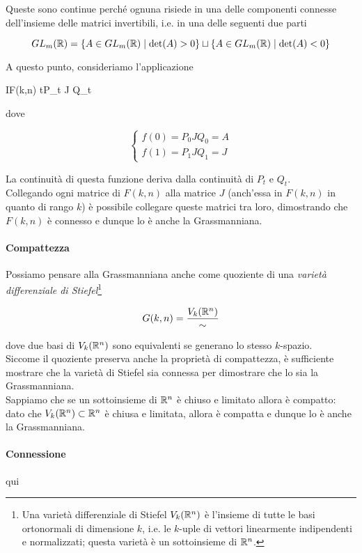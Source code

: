{Queste sono continue perché ognuna risiede in una delle componenti connesse dell'insieme delle matrici invertibili, i.e. in una delle seguenti due parti

\begin{equation}
	GL_{m}(\mathbb{R}) = \{ A \in GL_{m}(\mathbb{R}) \mid \det(A) > 0 \} \sqcup \{ A \in GL_{m}(\mathbb{R}) \mid \det(A) < 0 \}
\end{equation}

A questo punto, consideriamo l'applicazione

	{I}{F(k,n)}
	{t}{P_{t} J Q_{t}}

dove

\begin{equation}
	\begin{cases}
		f(0) = P_{0} J Q_{0} = A \\
		f(1) = P_{1} J Q_{1} = J
	\end{cases}
\end{equation}

La continuità di questa funzione deriva dalla continuità di $ P_{t} $ e $ Q_{t} $. \\
Collegando ogni matrice di $ F(k,n) $ alla matrice $ J $ (anch'essa in $ F(k,n) $ in quanto di rango $ k $) è possibile collegare queste matrici tra loro, dimostrando che $ F(k,n) $ è connesso e dunque lo è anche la Grassmanniana.

\paragraph{Compattezza}

Possiamo pensare alla Grassmanniana anche come quoziente di una \textit{varietà differenziale di Stiefel}\footnote{%
	Una varietà differenziale di Stiefel $ V_{k}(\mathbb{R}^{n}) $ è l'insieme di tutte le basi ortonormali di dimensione $ k $, i.e. le $ k $-uple di vettori linearmente indipendenti e normalizzati; questa varietà è un sottoinsieme di $ \mathbb{R}^{n} $.%
}

\begin{equation}
	G(k,n) = \dfrac{V_{k}(\mathbb{R}^{n})}{\sim}
\end{equation}

dove due basi di $ V_{k}(\mathbb{R}^{n}) $ sono equivalenti se generano lo stesso $ k $-spazio. \\
Siccome il quoziente preserva anche la proprietà di compattezza, è sufficiente mostrare che la varietà di Stiefel sia connessa per dimostrare che lo sia la Grassmanniana. \\
Sappiamo che se un sottoinsieme di $ \mathbb{R}^{n} $ è chiuso e limitato allora è compatto: dato che $ V_{k}(\mathbb{R}^{n}) \subset \mathbb{R}^{n} $ è chiusa e limitata, allora è compatta e dunque lo è anche la Grassmanniana.

\paragraph{Connessione}

qui

}

